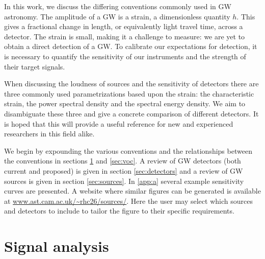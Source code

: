 In this work, we discuss the differing conventions commonly used in GW astronomy. The amplitude of a GW is a strain, a dimensionless quantity $h$. This gives a fractional change in length, or equivalently light travel time, across a detector. The strain is small, making it a challenge to measure: we are yet to obtain a direct detection
of a GW. To calibrate our expectations for detection, it is necessary to quantify the sensitivity of our instruments and the strength of their target signals.

When discussing the loudness of sources and the sensitivity of detectors there are three commonly used parametrizations based upon the strain: the characteristic strain, the power spectral density and the spectral energy density. We aim to disambiguate these three and give a concrete comparison of different detectors. It is hoped that this will provide a useful reference for new and experienced researchers in this field alike. 

We begin by expounding the various conventions and the relationships between the conventions in sections \ref{sec:conventions} and \ref{sec:voc}. A review of GW detectors (both current and proposed) is given in section \ref{sec:detectors} and a review of GW sources is given in section \ref{sec:sources}. In \ref{app:a} several example sensitivity curves are presented. A website where similar figures can be generated is available at \url{www.ast.cam.ac.uk/~rhc26/sources/}. Here the user may select which sources and detectors to include to tailor the figure to their specific requirements.


\section{Signal analysis}\label{sec:conventions}


